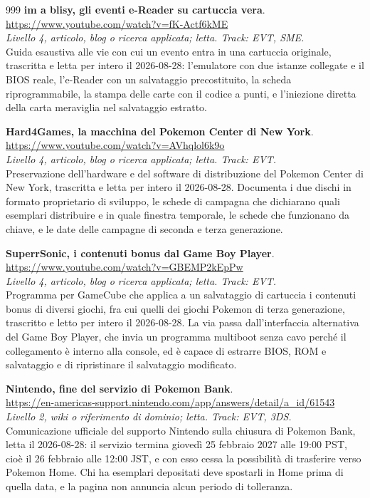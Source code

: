 \begin{thebibliography}{999}
  \textbf{im a blisy, gli eventi e-Reader su cartuccia vera}.
  \\ \url{https://www.youtube.com/watch?v=fK-Actf6kME}
  \\ \emph{Livello 4, articolo, blog o ricerca applicata; letta. Track: EVT, SME.}
  \\ Guida esaustiva alle vie con cui un evento entra in una cartuccia originale, trascritta e letta per intero il 2026-08-28: l'emulatore con due istanze collegate e il BIOS reale, l'e-Reader con un salvataggio precostituito, la scheda riprogrammabile, la stampa delle carte con il codice a punti, e l'iniezione diretta della carta meraviglia nel salvataggio estratto.

  \textbf{Hard4Games, la macchina del Pokemon Center di New York}.
  \\ \url{https://www.youtube.com/watch?v=AVhqlol6k9o}
  \\ \emph{Livello 4, articolo, blog o ricerca applicata; letta. Track: EVT.}
  \\ Preservazione dell'hardware e del software di distribuzione del Pokemon Center di New York, trascritta e letta per intero il 2026-08-28. Documenta i due dischi in formato proprietario di sviluppo, le schede di campagna che dichiarano quali esemplari distribuire e in quale finestra temporale, le schede che funzionano da chiave, e le date delle campagne di seconda e terza generazione.

  \textbf{SuperrSonic, i contenuti bonus dal Game Boy Player}.
  \\ \url{https://www.youtube.com/watch?v=GBEMP2kEpPw}
  \\ \emph{Livello 4, articolo, blog o ricerca applicata; letta. Track: EVT.}
  \\ Programma per GameCube che applica a un salvataggio di cartuccia i contenuti bonus di diversi giochi, fra cui quelli dei giochi Pokemon di terza generazione, trascritto e letto per intero il 2026-08-28. La via passa dall'interfaccia alternativa del Game Boy Player, che invia un programma multiboot senza cavo perché il collegamento è interno alla console, ed è capace di estrarre BIOS, ROM e salvataggio e di ripristinare il salvataggio modificato.

  \textbf{Nintendo, fine del servizio di Pokemon Bank}.
  \\ \url{https://en-americas-support.nintendo.com/app/answers/detail/a_id/61543}
  \\ \emph{Livello 2, wiki o riferimento di dominio; letta. Track: EVT, 3DS.}
  \\ Comunicazione ufficiale del supporto Nintendo sulla chiusura di Pokemon Bank, letta il 2026-08-28: il servizio termina giovedì 25 febbraio 2027 alle 19:00 PST, cioè il 26 febbraio alle 12:00 JST, e con esso cessa la possibilità di trasferire verso Pokemon Home. Chi ha esemplari depositati deve spostarli in Home prima di quella data, e la pagina non annuncia alcun periodo di tolleranza.


\end{thebibliography}
